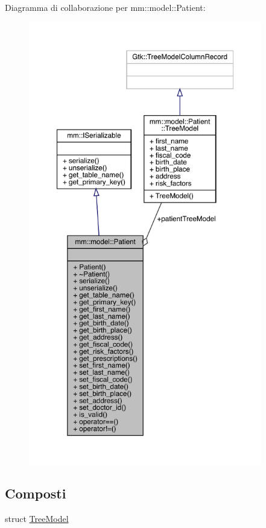 Diagramma di collaborazione per mm\+:\+:model\+:\+:Patient\+:\nopagebreak
\begin{figure}[H]
\begin{center}
\leavevmode
\includegraphics[height=550pt]{dc/d82/classmm_1_1model_1_1_patient__coll__graph}
\end{center}
\end{figure}
\subsection*{Composti}
\begin{DoxyCompactItemize}
\item 
struct \hyperlink{structmm_1_1model_1_1_patient_1_1_tree_model}{Tree\+Model}
\end{DoxyCompactItemize}
